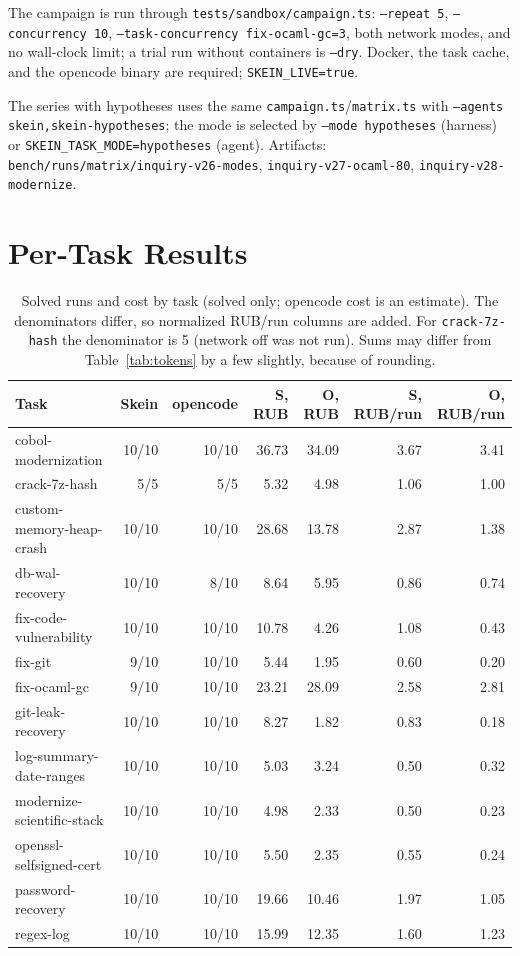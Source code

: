 \documentclass[11pt,a4paper]{article}
\begin{document}
The campaign is run through \texttt{tests/sandbox/campaign.ts}: \texttt{--repeat 5},
\texttt{--concurrency 10}, \texttt{--task-concurrency fix-ocaml-gc=3}, both network modes, and no
wall-clock limit; a trial run without containers is \texttt{--dry}. Docker, the task cache, and
the opencode binary are required; \texttt{SKEIN\_LIVE=true}.

The series with hypotheses uses the same \texttt{campaign.ts}/\texttt{matrix.ts} with
\texttt{--agents skein,skein-hypotheses}; the mode is selected by \texttt{--mode hypotheses}
(harness) or \texttt{SKEIN\_TASK\_MODE=hypotheses} (agent). Artifacts:
\texttt{bench/runs/matrix/inquiry-v26-modes}, \texttt{inquiry-v27-ocaml-80},
\texttt{inquiry-v28-modernize}.

\section{Per-Task Results}

\begin{table}[h]
\centering
\small
\caption{Solved runs and cost by task (solved only; opencode cost is an estimate). The
denominators differ, so normalized RUB/run columns are added. For \texttt{crack-7z-hash} the
denominator is 5 (network off was not run). Sums may differ from Table~\ref{tab:tokens} by a few
slightly, because of rounding.}
\label{tab:pertask}
\begin{tabular}{@{}lrrrrrr@{}}
\toprule
Task & Skein & opencode & S, RUB & O, RUB & S, RUB/run & O, RUB/run \\
\midrule
cobol-modernization & 10/10 & 10/10 & 36.73 & 34.09 & 3.67 & 3.41 \\
crack-7z-hash & 5/5 & 5/5 & 5.32 & 4.98 & 1.06 & 1.00 \\
custom-memory-heap-crash & 10/10 & 10/10 & 28.68 & 13.78 & 2.87 & 1.38 \\
db-wal-recovery & 10/10 & 8/10 & 8.64 & 5.95 & 0.86 & 0.74 \\
fix-code-vulnerability & 10/10 & 10/10 & 10.78 & 4.26 & 1.08 & 0.43 \\
fix-git & 9/10 & 10/10 & 5.44 & 1.95 & 0.60 & 0.20 \\
fix-ocaml-gc & 9/10 & 10/10 & 23.21 & 28.09 & 2.58 & 2.81 \\
git-leak-recovery & 10/10 & 10/10 & 8.27 & 1.82 & 0.83 & 0.18 \\
log-summary-date-ranges & 10/10 & 10/10 & 5.03 & 3.24 & 0.50 & 0.32 \\
modernize-scientific-stack & 10/10 & 10/10 & 4.98 & 2.33 & 0.50 & 0.23 \\
openssl-selfsigned-cert & 10/10 & 10/10 & 5.50 & 2.35 & 0.55 & 0.24 \\
password-recovery & 10/10 & 10/10 & 19.66 & 10.46 & 1.97 & 1.05 \\
regex-log & 10/10 & 10/10 & 15.99 & 12.35 & 1.60 & 1.23 \\
\bottomrule
\end{tabular}
\end{table}

\clearpage


\end{document}
